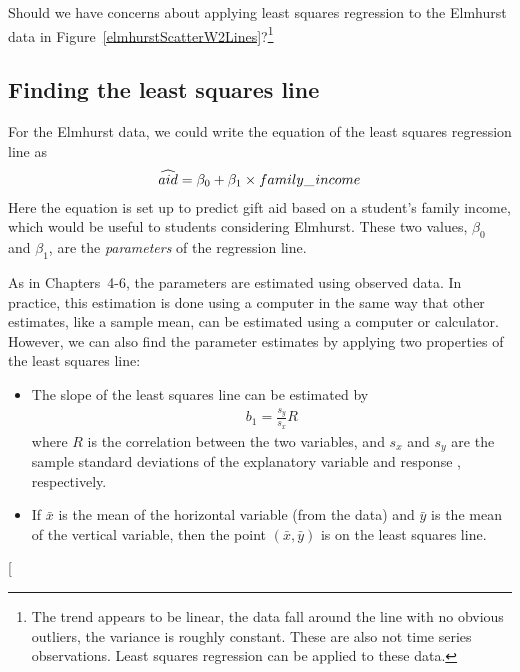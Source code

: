 \begin{exercise}
Should we have concerns about applying least squares regression to the Elmhurst data in Figure~\ref{elmhurstScatterW2Lines}?\footnote{The trend appears to be linear, the data fall around the line with no obvious outliers, the variance is roughly constant. These are also not time series observations. Least squares regression can be applied to these data.}
\end{exercise}



\subsection{Finding the least squares line}
\label{findingTheLeastSquaresLineSection}

For the Elmhurst data, we could write the equation of the least squares regression line as
\begin{eqnarray*}
\widehat{aid} = \beta_0 + \beta_{1}\times family\_\hspace{0.3mm}income
\end{eqnarray*}
Here the equation is set up to predict gift aid based on a student's family income, which would be useful to students considering Elmhurst. These two values, $\beta_0$ and $\beta_1$, are the \emph{parameters} of the regression line.

As in Chapters~4-6, the parameters are estimated using observed data. In practice, this estimation is done using a computer in the same way that other estimates, like a sample mean, can be estimated using a computer or calculator. However, we can also find the parameter estimates by applying two properties of the least squares line:
\begin{itemize}
\item The slope of the least squares line can be estimated by
\begin{eqnarray}
b_1 = \frac{s_y}{s_x} R
\label{slopeOfLSRLine}
\end{eqnarray}
where $R$ is the correlation between the two variables, and $s_x$ and $s_y$ are the sample standard deviations of the explanatory variable %
and response%
, respectively.
\item If $\bar{x}$ is the mean of the horizontal variable (from the data) and $\bar{y}$ is the mean of the vertical variable, then the point $(\bar{x}, \bar{y})$ is on the least squares line.
\end{itemize}
\marginpar[\raggedright\vspace{0.5mm}

